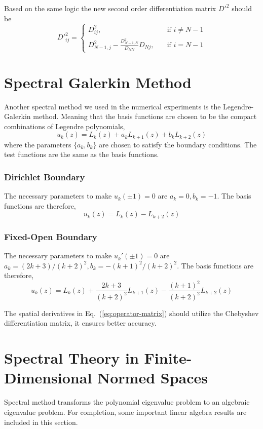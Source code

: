 Based on the same logic the new second order differentiation matrix $D'^2$ should be
\begin{equation}
	D'^2_{ij} = \begin{cases}
		D^2_{ij}, \quad                                       & \text{if $i\neq N-1$} \\
		D^2_{N-1,j} - \frac{D^2_{N-1,N}}{D_{NN}}D_{Nj}, \quad & \text{if $i=N-1$}
	\end{cases}
\end{equation}


\section{Spectral Galerkin Method}
Another spectral method we used in the numerical experiments is the Legendre-Galerkin method. Meaning that the basis functions are chosen to be the compact combinations of Legendre polynomials, \cite{shen_tang_etal_spectral_2011}
\begin{equation}
	u_k(z) = L_k(z) + a_kL_{k+1}(z) + b_kL_{k+2}(z)
\end{equation}
where the parameters $\{a_k,b_k\}$ are chosen to satisfy the boundary conditions. The test functions are the same as the basis functions.

\subsubsection*{Dirichlet Boundary}
The necessary parameters to make $u_k(\pm 1) = 0$ are $a_k=0, b_k=-1$. The basis functions are therefore,
\begin{equation}
	u_k(z) = L_k(z) - L_{k+2}(z)
\end{equation}

\subsubsection*{Fixed-Open Boundary}
The necessary parameters to make $u_k'(\pm 1) = 0$ are $a_k=(2k+3)/(k+2)^2, b_k=-(k+1)^2/(k+2)^2$. The basis functions are therefore,
\begin{equation}
	u_k(z) = L_k(z) + \frac{2k+3}{(k+2)^2}L_{k+1}(z) - \frac{(k+1)^2}{(k+2)^2}L_{k+2}(z)
\end{equation}

The spatial derivatives in Eq.~(\ref{eq:operator-matrix}) should utilize the Chebyshev differentiation matrix, it ensures better accuracy.


\section{Spectral Theory in Finite-Dimensional Normed Spaces}
Spectral method transforms the polynomial eigenvalue problem to an algebraic eigenvalue problem. For completion, some important linear algebra results are included in this section.

